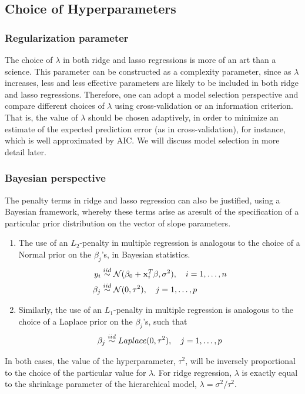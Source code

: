 \subsection*{Choice of Hyperparameters}
\subsubsection*{Regularization parameter}

The choice of $\lambda$ in both ridge and lasso regressions is more of an art than a science.
This parameter can be constructed as a complexity parameter, since as $\lambda$ increases, less and less effective parameters are likely to be included in both ridge and lasso regressions.
Therefore, one can adopt a model selection perspective and compare different choices of $\lambda$ using cross-validation or an information criterion.
That is, the value of $\lambda$ should be chosen adaptively, in order to minimize an estimate of the expected prediction error (as in cross-validation), for instance,
which is well approximated by AIC.
We will discuss model selection in more detail later.

\subsubsection*{Bayesian perspective}
The penalty terms in ridge and lasso regression can also be justified, using a Bayesian framework, whereby these terms arise as aresult of the specification of a particular prior distribution on the vector of slope parameters.

\begin{enumerate}
	\item The use of an $L_2$-penalty in multiple regression is analogous to the choice of a Normal prior on the $\beta_j$'s, in Bayesian statistics.
	$$
	\begin{aligned}
		y_i  &\overset{iid}{\sim} \mathcal{N}(\beta_0 + \mathbf{x}_i^T\beta, \sigma^2), \quad  i = 1, \dots, n\\
		\beta_j  &\overset{iid}{\sim} \mathcal{N}(0, \tau^2), \quad j = 1, \dots, p\\
	\end{aligned}
	$$
	\item Similarly, the use of an $L_1$-penalty in multiple regression is analogous to the choice of a Laplace prior on the $\beta_j$'s, such that
	$$
	\begin{aligned}
	\beta_j  &\overset{iid}{\sim} Laplace(0, \tau^2), \quad j = 1, \dots, p\\
	\end{aligned}	
	$$
\end{enumerate}
In both cases, the value of the hyperparameter, $\tau^2$, will be inversely proportional to the choice of the particular value for $\lambda$.
For ridge regression, $\lambda$ is exactly equal to the shrinkage parameter of the hierarchical model, $\lambda = {\sigma^2}/{\tau^2}$.

